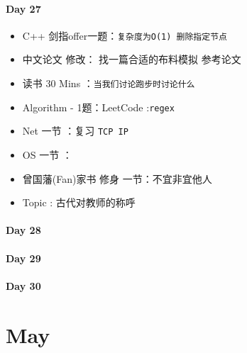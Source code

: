 \documentclass[UTF8,a4paper,8pt]{ctexart}
\begin{document}
 	 \paragraph{Day 27      \quad     }
		 	 \begin{itemize}[itemindent = 1em]
		 	 	\renewcommand\labelitemi{\makebox[0pt][l]{$\square$}\hspace{1em}} 
		 	 	\renewcommand\labelitemi{\makebox[0pt][l]{$\square$}\raisebox{.15ex}{\hspace{0.1em}$\checkmark$}}	 	
		 	 	\item   C++ 剑指offer一题：\verb|复杂度为O(1) 删除指定节点|
		 	 	\item   中文论文 修改： 找一篇合适的布料模拟 参考论文
		 	 	
		 	 	\item   读书  30 Mins	：\verb|当我们讨论跑步时讨论什么|
		 	 	\item   Algorithm - 1题：LeetCode :\verb|regex|	
		 	 	\item   Net 一节 ：复习 \verb|TCP IP|	
		 	 	\renewcommand\labelitemi{\makebox[0pt][l]{$\square$}\hspace{1em}} 
		 	 	
		 	 	\item   OS  一节 ：
		 	 	
		 	 	\renewcommand\labelitemi{\makebox[0pt][l]{$\square$}\raisebox{.15ex}{\hspace{0.1em}$\checkmark$}}
		 	 	\item   曾国藩(Fan)家书 修身 一节：不宜非宜他人
		 	 	\item   Topic : 古代对教师的称呼
		 	 \end{itemize}
 	 \paragraph{Day 28      \quad     }
 	 \paragraph{Day 29      \quad     }   
 	 \paragraph{Day 30      \quad     }
 	 
 \section{May}
\end{document}
